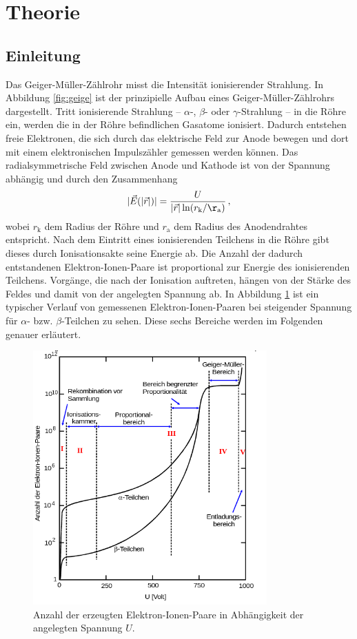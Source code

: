 \section{Theorie}
\label{sec:Theorie}

\subsection{Einleitung}
Das Geiger-Müller-Zählrohr misst die Intensität ionisierender Strahlung.
In Abbildung \ref{fig:geige} ist der prinzipielle Aufbau eines Geiger-Müller-Zählrohrs
dargestellt.
Tritt ionisierende Strahlung -- $\alpha$-, $\beta$- oder $\gamma$-Strahlung -- in die Röhre
ein, werden die in der Röhre befindlichen Gasatome ionisiert. Dadurch entstehen freie Elektronen,
die sich durch das elektrische Feld zur Anode bewegen und dort mit einem elektronischen
Impulszähler gemessen werden können.
Das radialsymmetrische Feld zwischen Anode und Kathode ist von der Spannung abhängig und durch
den Zusammenhang
\begin{equation}
	|\vec{E}(|\vec{r}|)| = \frac{U}{|\vec{r}| \ln(r_{\mathrm{k}} / \r_{\mathrm{a}})} \, \mathrm{,}
\end{equation}
wobei $r_{\mathrm{k}}$ dem Radius der Röhre und $r_{\mathrm{a}}$ dem Radius des Anodendrahtes
entspricht.
Nach dem Eintritt eines ionisierenden Teilchens in die Röhre gibt dieses durch Ionisationsakte
seine Energie ab. Die Anzahl der dadurch entstandenen Elektron-Ionen-Paare ist proportional
zur Energie des ionisierenden Teilchens.
Vorgänge, die nach der Ionisation auftreten, hängen von der Stärke des Feldes und damit von der
angelegten Spannung ab.
In Abbildung \ref{fig:voltage_ions} ist ein typischer Verlauf von gemessenen
Elektron-Ionen-Paaren bei steigender Spannung für $\alpha$- bzw. $\beta$-Teilchen zu sehen.
Diese sechs Bereiche werden im Folgenden genauer erläutert.
\begin{figure}
	\centering
	\includegraphics[width=0.8\textwidth]{Bilder/graph_erzeugte_inonen.png}%
	\caption{Anzahl der erzeugten Elektron-Ionen-Paare in Abhängigkeit der angelegten Spannung $U$. \cite{Anleitung}}
	\label{fig:voltage_ions}
\end{figure}
